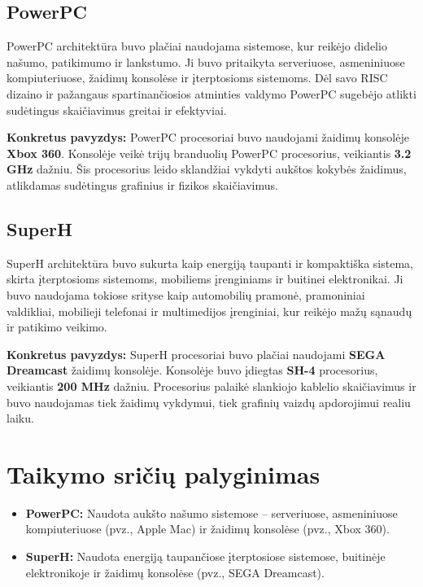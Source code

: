 \documentclass{article}
\begin{document}
\subsection{PowerPC}
PowerPC architektūra buvo plačiai naudojama sistemose, kur reikėjo didelio našumo, patikimumo ir lankstumo. Ji buvo pritaikyta serveriuose, asmeniniuose kompiuteriuose, žaidimų konsolėse ir įterptosioms sistemoms. Dėl savo RISC dizaino ir pažangaus spartinančiosios atminties valdymo PowerPC sugebėjo atlikti sudėtingus skaičiavimus greitai ir efektyviai.

\textbf{Konkretus pavyzdys:} PowerPC procesoriai buvo naudojami žaidimų konsolėje \textbf{Xbox 360}. Konsolėje veikė trijų branduolių PowerPC procesorius, veikiantis \textbf{3.2 GHz} dažniu. Šis procesorius leido sklandžiai vykdyti aukštos kokybės žaidimus, atlikdamas sudėtingus grafinius ir fizikos skaičiavimus.

\subsection{SuperH}
SuperH architektūra buvo sukurta kaip energiją taupanti ir kompaktiška sistema, skirta įterptosioms sistemoms, mobiliems įrenginiams ir buitinei elektronikai. Ji buvo naudojama tokiose srityse kaip automobilių pramonė, pramoniniai valdikliai, mobilieji telefonai ir multimedijos įrenginiai, kur reikėjo mažų sąnaudų ir patikimo veikimo.

\textbf{Konkretus pavyzdys:} SuperH procesoriai buvo plačiai naudojami \textbf{SEGA Dreamcast} žaidimų konsolėje. Konsolėje buvo įdiegtas \textbf{SH-4} procesorius, veikiantis \textbf{200 MHz} dažniu. Procesorius palaikė slankiojo kablelio skaičiavimus ir buvo naudojamas tiek žaidimų vykdymui, tiek grafinių vaizdų apdorojimui realiu laiku.

\section*{Taikymo sričių palyginimas}
\begin{itemize}
    \item \textbf{PowerPC:} Naudota aukšto našumo sistemose – serveriuose, asmeniniuose kompiuteriuose (pvz., Apple Mac) ir žaidimų konsolėse (pvz., Xbox 360).
    \item \textbf{SuperH:} Naudota energiją taupančiose įterptosiose sistemose, buitinėje elektronikoje ir žaidimų konsolėse (pvz., SEGA Dreamcast).
\end{itemize}
\end{document}

